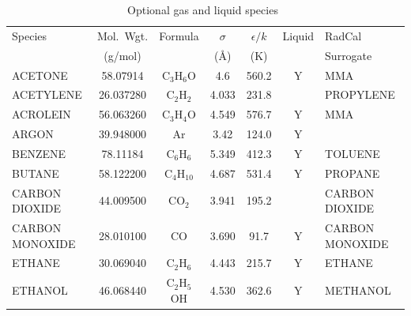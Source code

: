 \documentclass[11pt]{book}
\begin{document}
\begin{table}[p]
\begin{center}
\caption[Optional gas and liquid species]{Optional gas and liquid species~\cite{Reid:1}}
\label{tab:gasspecies}
\vspace{0.1in}
\begin{tabular}{|l|c|c|c|c|c|l|}
\hline
Species &   Mol.~Wgt.           & Formula          & $\sigma$ & $\epsilon/k$   & Liquid   & RadCal                          \\
        &   (g/mol)             &                  & (\AA)    & (K)            &          & Surrogate                       \\ \hline
\hline
{\ct ACETONE}            & 58.07914   & C$_3$H$_6$O      & 4.6      & 560.2    &  Y       &  {\ct MMA}                      \\ \hline
{\ct ACETYLENE}          & 26.037280  & C$_2$H$_2$       & 4.033    & 231.8    &          &  {\ct PROPYLENE}                \\ \hline
{\ct ACROLEIN}           & 56.063260  & C$_3$H$_4$O      & 4.549    & 576.7    &  Y       &  {\ct MMA}                      \\ \hline
{\ct ARGON}              & 39.948000  & Ar               & 3.42     & 124.0    &  Y       &                                 \\ \hline
{\ct BENZENE}            & 78.11184   & C$_6$H$_6$       & 5.349    & 412.3    &  Y       &  {\ct TOLUENE}                  \\ \hline
{\ct BUTANE}             & 58.122200  & C$_4$H$_{10}$    & 4.687    & 531.4    &  Y       &  {\ct PROPANE}                  \\ \hline
{\ct CARBON DIOXIDE}     & 44.009500  & CO$_2$           & 3.941    & 195.2    &          &  {\ct CARBON DIOXIDE}           \\ \hline
{\ct CARBON MONOXIDE}    & 28.010100  & CO               & 3.690    & 91.7     &  Y       &  {\ct CARBON MONOXIDE}          \\ \hline
{\ct ETHANE}             & 30.069040  & C$_2$H$_6$       & 4.443    & 215.7    &  Y       &  {\ct ETHANE}                   \\ \hline
{\ct ETHANOL}            & 46.068440  & C$_2$H$_5$OH     & 4.530    & 362.6    &  Y       &  {\ct METHANOL}                 \\ \hline

\end{tabular}
\end{center}
\end{table}
\end{document}
